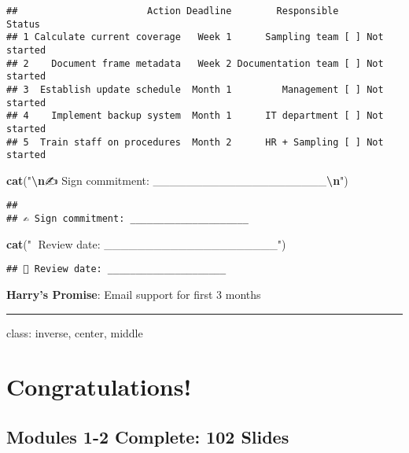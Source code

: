 \documentclass[
]{article}
\newenvironment{Shaded}{\begin{snugshade}}{\end{snugshade}}
\newcommand{\FunctionTok}[1]{\textcolor[rgb]{0.13,0.29,0.53}{\textbf{#1}}}
\newcommand{\NormalTok}[1]{#1}
\newcommand{\SpecialCharTok}[1]{\textcolor[rgb]{0.81,0.36,0.00}{\textbf{#1}}}
\newcommand{\StringTok}[1]{\textcolor[rgb]{0.31,0.60,0.02}{#1}}
\begin{document}
\begin{verbatim}
##                       Action Deadline        Responsible          Status
## 1 Calculate current coverage   Week 1      Sampling team [ ] Not started
## 2    Document frame metadata   Week 2 Documentation team [ ] Not started
## 3  Establish update schedule  Month 1         Management [ ] Not started
## 4    Implement backup system  Month 1      IT department [ ] Not started
## 5  Train staff on procedures  Month 2      HR + Sampling [ ] Not started
\end{verbatim}

\begin{Shaded}
\begin{Highlighting}[]
\FunctionTok{cat}\NormalTok{(}\StringTok{"}\SpecialCharTok{\textbackslash{}n}\StringTok{✍️ Sign commitment: \_\_\_\_\_\_\_\_\_\_\_\_\_\_\_\_\_\_\_\_\_}\SpecialCharTok{\textbackslash{}n}\StringTok{"}\NormalTok{)}
\end{Highlighting}
\end{Shaded}

\begin{verbatim}
## 
## ✍️ Sign commitment: _____________________
\end{verbatim}

\begin{Shaded}
\begin{Highlighting}[]
\FunctionTok{cat}\NormalTok{(}\StringTok{"📅 Review date: \_\_\_\_\_\_\_\_\_\_\_\_\_\_\_\_\_\_\_\_\_"}\NormalTok{)}
\end{Highlighting}
\end{Shaded}

\begin{verbatim}
## 📅 Review date: _____________________
\end{verbatim}

\textbf{Harry's Promise}: Email support for first 3 months

\begin{center}\rule{0.5\linewidth}{0.5pt}\end{center}

class: inverse, center, middle

\section{Congratulations!}\label{congratulations}

\subsection{Modules 1-2 Complete: 102
Slides}\label{modules-1-2-complete-102-slides}
\end{document}
